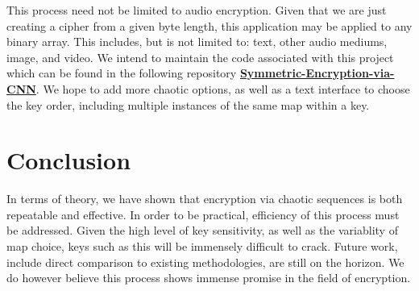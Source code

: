 \documentclass[conference]{IEEEtran}
\begin{document}
This process need not be limited to audio encryption.
Given that we are just creating a cipher from a given byte length, this application may be applied to any binary array.
This includes, but is not limited to: text, other audio mediums, image, and video.
We intend to maintain the code associated with this project which can be found in the following repository \href{https://github.com/ppfenning/Symmetric-Encryption-via-CNN}{\textbf{Symmetric-Encryption-via-CNN}}.
We hope to add more chaotic options, as well as a text interface to choose the key order, including multiple instances of the same map within a key.

\section{Conclusion}\label{sec:conclusion}

In terms of theory, we have shown that encryption via chaotic sequences is both repeatable and effective.
In order to be practical, efficiency of this process must be addressed.
Given the high level of key sensitivity, as well as the variablity of map choice, keys such as this will be immensely difficult to crack.
Future work, include direct comparison to existing methodologies, are still on the horizon.
We do however believe this process shows immense promise in the field of encryption.



\end{document}
